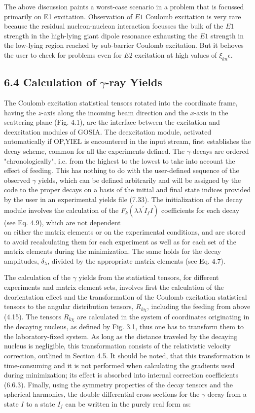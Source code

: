 \documentclass[10pt]{article}
\begin{document}
The above discussion paints a worst-case scenario in a problem that is focussed primarily on E1 excitation. Observation of $E 1$ Coulomb excitation is very rare because the residual nucleon-nucleon interaction focusses the bulk of the $E 1$ strength in the high-lying giant dipole resonance exhausting the $E 1$ strength in the low-lying region reached by sub-barrier Coulomb excitation. But it behoves the user to check for problems even for $E 2$ excitation at high values of $\xi_{k n} \epsilon$.

\subsection*{6.4 Calculation of $\gamma$-ray Yields}
The Coulomb excitation statistical tensors rotated into the coordinate frame, having the $z$-axis along the incoming beam direction and the $x$-axis in the scattering plane (Fig. 4.1), are the interface between the excitation and deexcitation modules of GOSIA. The deexcitation module, activated automatically if OP,YIEL is encountered in the input stream, first establishes the decay scheme, common for all the experiments defined. The $\gamma$-decays are ordered "chronologically", i.e. from the highest to the lowest to take into account the effect of feeding. This has nothing to do with the user-defined sequence of the observed $\gamma$ yields, which can be defined arbitrarily and will be assigned by the code to the proper decays on a basis of the initial and final state indices provided by the user in an experimental yields file (7.33). The initialization of the decay module involves the calculation of the $F_{k}\left(\lambda \lambda^{\prime} I_{f} I\right)$ coefficients for each decay (see Eq. 4.9), which are not dependent\\
on either the matrix elements or on the experimental conditions, and are stored to avoid recalculating them for each experiment as well as for each set of the matrix elements during the minimization. The same holds for the decay amplitudes, $\delta_{\lambda}$, divided by the appropriate matrix elements (see Eq. 4.7).

The calculation of the $\gamma$ yields from the statistical tensors, for different experiments and matrix element sets, involves first the calculation of the deorientation effect and the transformation of the Coulomb excitation statistical tensors to the angular distribution tensors, $R_{k \chi}$, including the feeding from above (4.15). The tensors $R_{k \chi}$ are calculated in the system of coordinates originating in the decaying nucleus, as defined by Fig. 3.1, thus one has to transform them to the laboratory-fixed system. As long as the distance traveled by the decaying nucleus is negligible, this transformation consists of the relativistic velocity correction, outlined in Section 4.5. It should be noted, that this transformation is time-consuming and it is not performed when calculating the gradients used during minimization; its effect is absorbed into internal correction coefficients (6.6.3). Finally, using the symmetry properties of the decay tensors and the spherical harmonics, the double differential cross sections for the $\gamma$ decay from a state $I$ to a state $I_{f}$ can be written in the purely real form as:
\end{document}
